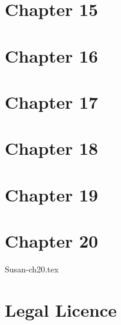 \documentclass[12pt,twoside,onecolumn,openright,extrafontsizes]{memoir}
\begin{document}
\chapter{Chapter 15}
\lipsum[81-100]
\chapter{Chapter 16}
\lipsum[101-120]
\chapter{Chapter 17}
\lipsum[121-140]
\chapter{Chapter 18}
\lipsum[141-160]
\chapter{Chapter 19}
\lipsum[61-80]
\chapter{Chapter 20}
 {Susan-ch20.tex}




\chapter{Legal Licence}


\end{document}
